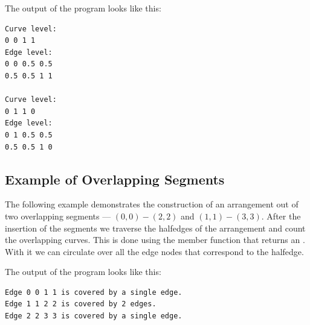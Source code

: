 
The output of the program looks like this:
\begin{verbatim}
Curve level:
0 0 1 1
Edge level:
0 0 0.5 0.5
0.5 0.5 1 1

Curve level:
0 1 1 0
Edge level:
0 1 0.5 0.5
0.5 0.5 1 0
\end{verbatim}

\subsection{Example of Overlapping Segments}
\label{ssec:example2}
The following example demonstrates the construction of an
arrangement out of two overlapping segments --- $(0,0)-(2,2)$
and $(1,1)-(3,3)$.
After the insertion of the segments we
traverse the halfedges
of the arrangement and count the overlapping curves.
This is done using the  member function that returns an
. With it we can circulate
over all the edge nodes that correspond to the halfedge.


The output of the program looks like this:
\begin{verbatim}
Edge 0 0 1 1 is covered by a single edge.
Edge 1 1 2 2 is covered by 2 edges.
Edge 2 2 3 3 is covered by a single edge.
\end{verbatim}


